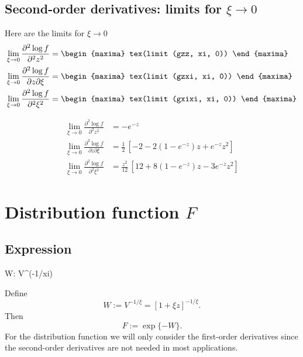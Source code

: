 \subsection{Second-order derivatives: limits for $\xi \to 0$}
Here are the limits for $\xi \to 0$
{\color{MonVertF}
  \begin{align*}
  \lim_{\xi \to 0} \frac{\partial^2 \log f}{\partial^2 z^2}
  &=
    \begin{maxima}
      tex(limit (gzz, xi, 0))
    \end{maxima}
  \\
  \lim_{\xi \to 0} \frac{\partial^2 \log f}{\partial z \partial \xi}
  &=
    \begin{maxima}
      tex(limit (gzxi, xi, 0))
    \end{maxima}
  \\
  \lim_{\xi \to 0} \frac{\partial^2 \log f}{\partial^2 \xi^2}
   &=
    \begin{maxima}
      tex(limit (gxixi, xi, 0))
    \end{maxima}
\end{align*}
}

{\color{red}
\begin{align*}
  \lim_{\xi \to 0} \frac{\partial^2 \log f}{\partial^2 z^2}
  &= -e^{-z}
  \\
  \lim_{\xi \to 0} \frac{\partial^2 \log f}{\partial z \partial \xi}
  &= \frac{1}{2} \, \left[ -2  - 2 (1 - e^{-z}) z  + e^{-z} z^2\right]  
  \\
  \lim_{\xi \to 0} \frac{\partial^2 \log f}{\partial^2 \xi^2}
   &=
    \frac{z^2}{12} \, \left[12 + 8 (1 - e^{-z}) z -3 e^{-z} z^2 \right]
\end{align*}}

\section{Distribution function $F$}

\subsection{Expression}

\begin{maxima}
  W: V^(-1/xi)
\end{maxima}

Define
$$
W := V^{-1/\xi} = [1 + \xi z]^{-1/\xi}.
$$
Then
$$
 F := \exp\{ - W \}.
$$
For the distribution function we will only consider the first-order derivatives
since the second-order derivatives are not needed in most applications.

